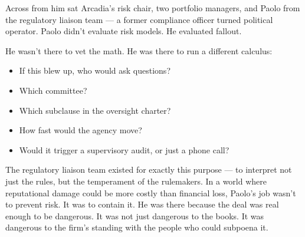 Across from him sat Arcadia’s risk chair, two portfolio managers, and Paolo from the regulatory liaison team — a former 
compliance officer turned political operator. Paolo didn’t evaluate risk models. He evaluated fallout.

He wasn’t there to vet the math. He was there to run a different calculus:

\begin{itemize}
  \item If this blew up, who would ask questions?
  \item Which committee?
  \item Which subclause in the oversight charter?
  \item How fast would the agency move?
  \item Would it trigger a supervisory audit, or just a phone call?
\end{itemize}

The regulatory liaison team existed for exactly this purpose — to interpret not just the rules, but the temperament of the 
rulemakers.
In a world where reputational damage could be more costly than financial loss, Paolo’s job wasn’t to prevent risk. It was to 
contain it.
He was there because the deal was real enough to be dangerous. It was not just dangerous to the books. It was dangerous to the firm’s 
standing with the people who could subpoena it.

\medskip

